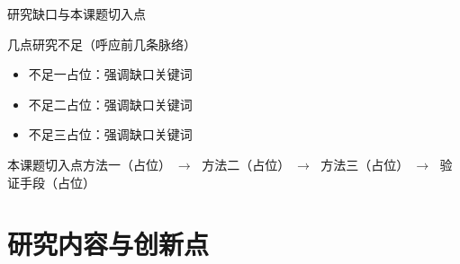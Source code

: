 \documentclass[aspectratio=169,11pt]{beamer}
\begin{document}
\begin{frame}{研究缺口与本课题切入点}
  \small
  \vspace*{-2.5mm}
  \begin{point}{几点研究不足（呼应前几条脉络）}
    \begin{itemize}
      \item[Ⅰ] 不足一占位：\textcolor{accent}{强调缺口关键词}
      \item[Ⅱ] 不足二占位：\textcolor{accent}{强调缺口关键词}
      \item[Ⅲ] 不足三占位：\textcolor{accent}{强调缺口关键词}
    \end{itemize}
  \end{point}
  \vskip-1.2mm
  \begin{band}
    {\footnotesize\color{accent}本课题切入点}\quad 方法一（占位）$\;\to\;$ 方法二（占位）$\;\to\;$ 方法三（占位）$\;\to\;$ 验证手段（占位）
  \end{band}
\end{frame}

\section{研究内容与创新点}
\end{document}

